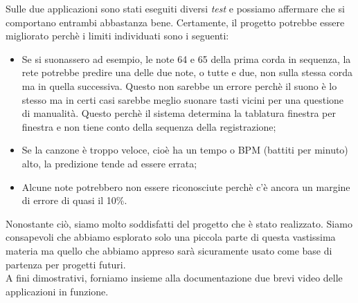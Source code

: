 Sulle due applicazioni sono stati eseguiti diversi \textit{test} e possiamo affermare che si comportano entrambi abbastanza bene. Certamente, il progetto potrebbe essere migliorato perchè i limiti individuati sono i seguenti:
\begin{itemize}
		\item Se si suonassero ad esempio, le note 64 e 65 della prima corda in sequenza, la rete potrebbe predire una delle due note, o tutte e due, non sulla stessa corda ma in quella successiva. Questo non sarebbe un errore perchè il suono è lo stesso ma in certi casi sarebbe meglio suonare tasti vicini per una questione di manualità. Questo perchè il sistema determina la tablatura finestra per finestra e non tiene conto della sequenza della registrazione;
		\item Se la canzone è troppo veloce, cioè ha un tempo o BPM (battiti per minuto) alto, la predizione tende ad essere errata;
		\item Alcune note potrebbero non essere riconosciute perchè c'è ancora un margine di errore di quasi il 10\%.
	\end{itemize}
Nonostante ciò, siamo molto soddisfatti del progetto che è stato realizzato. Siamo consapevoli che abbiamo esplorato solo una piccola parte di questa vastissima materia ma quello che abbiamo appreso sarà sicuramente usato come base di partenza per progetti futuri.\\
\newline
A fini dimostrativi, forniamo insieme alla documentazione due brevi video delle applicazioni in funzione.